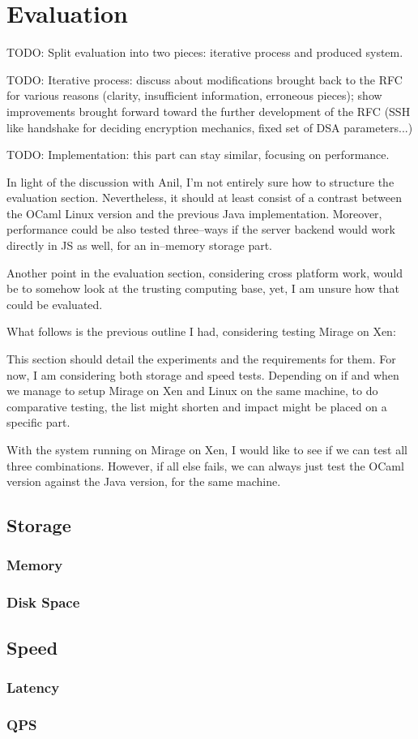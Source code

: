\chapter{Evaluation}

TODO: Split evaluation into two pieces: iterative process and produced system.

TODO: Iterative process: discuss about modifications brought back to the RFC for various reasons (clarity, insufficient information, erroneous pieces); show improvements brought forward toward the further development of the RFC (SSH like handshake for deciding encryption mechanics, fixed set of DSA parameters...)

TODO: Implementation: this part can stay similar, focusing on performance.

In light of the discussion with Anil, I'm not entirely sure how to structure the evaluation section.
Nevertheless, it should at least consist of a contrast between the OCaml Linux version and the previous Java implementation.
Moreover, performance could be also tested three--ways if the server backend would work directly in JS as well, for an in--memory storage part.

Another point in the evaluation section, considering cross platform work, would be to somehow look at the trusting computing base, yet, I am unsure how that could be evaluated.

What follows is the previous outline I had, considering testing Mirage on Xen:

This section should detail the experiments and the requirements for them.
For now, I am considering both storage and speed tests.
Depending on if and when we manage to setup Mirage on Xen and Linux on the same machine, to do comparative testing, the list might shorten and impact might be placed on a specific part.

With the system running on Mirage on Xen, I would like to see if we can test all three combinations.
However, if all else fails, we can always just test the OCaml version against the Java version, for the same machine.

\section{Storage}
\subsection{Memory}
\subsection{Disk Space}

\section{Speed}
\subsection{Latency}
\subsection{QPS}
